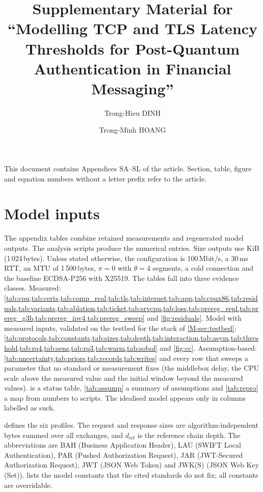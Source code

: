 \documentclass[preprint,12pt]{elsarticle}
\newcommand{\ms}{\,ms\xspace}
\newcommand{\Mbits}{\,Mbit/s\xspace}
\begin{document}
\begin{frontmatter}
\title{Supplementary Material for ``Modelling TCP and TLS Latency Thresholds for Post-Quantum Authentication in Financial Messaging''}
\author{Trong-Hieu DINH}
\author{Trong-Minh HOANG}
\end{frontmatter}

\noindent This document contains Appendices SA--SL of the article. Section, table, figure and equation numbers without a letter prefix refer to the article.
\appendix
{}
\renewcommand{\thesection}{S\Alph{section}}
\renewcommand{\thetable}{\thesection.\arabic{table}}\renewcommand{\thefigure}{\thesection.\arabic{figure}}

\section{Model inputs}
\label{app:inputs}
The appendix tables combine retained measurements and regenerated model outputs. The analysis scripts produce the numerical entries. Size outputs use KiB (1\,024\,bytes). Unless stated otherwise, the configuration is 100\Mbits, a 30\ms RTT, an MTU of 1\,500\,bytes, $\pi=0$ with $\theta=4$ segments, a cold connection and the baseline ECDSA-P256 with X25519. The tables fall into three evidence classes. Measured: \cref{tab:cpu,tab:certs,tab:comp_real,tab:tls,tab:internet,tab:app,tab:cpux86,tab:residuals,tab:variants,tab:ablation,tab:ticket,tab:srvcpu,tab:loss,tab:prereg_repl,tab:prereg_g3b,tab:prereg_ipv4,tab:prereg_sweep} and \cref{fig:residuals}. Model with measured inputs, validated on the testbed for the stack of \cref{M-sec:testbed}: \cref{tab:protocols,tab:constants,tab:sizes,tab:depth,tab:interaction,tab:asym,tab:threshold,tab:rq4,tab:sens,tab:rq3,tab:warm,tab:sobol} and \cref{fig:cc}. Assumption-based: \cref{tab:uncertainty,tab:priors,tab:records,tab:writes} and every row that sweeps a parameter that no standard or measurement fixes (the middlebox delay, the CPU scale above the measured value and the initial window beyond the measured values).  is a status table, \cref{tab:assump} a summary of assumptions and \cref{tab:repro} a map from numbers to scripts. The idealised model appears only in columns labelled as such.

 defines the six profiles. The request and response sizes are algorithm-independent bytes summed over all exchanges, and $d_\mathrm{ref}$ is the reference chain depth. The abbreviations are BAH (Business Application Header), LAU (SWIFT Local Authentication), PAR (Pushed Authorization Request), JAR (JWT-Secured Authorization Request), JWT (JSON Web Token) and JWK(S) (JSON Web Key (Set)).  lists the model constants that the cited standards do not fix; all constants are overridable.
\end{document}
